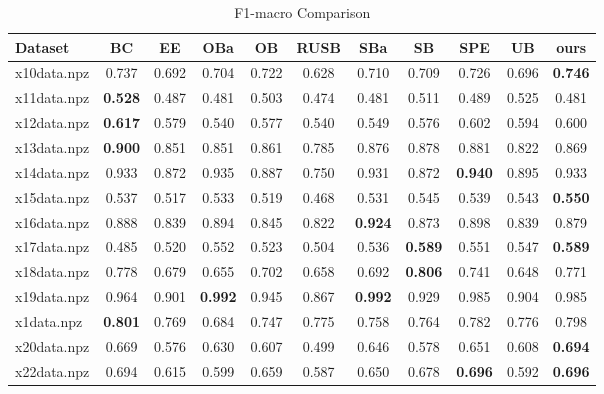 \documentclass{article}
\begin{document}
\begin{table}[htbp]
\centering
\caption{F1-macro Comparison}
\begin{adjustbox}{width=\textwidth}
\label{tab:f1-macro_comparison}
\begin{tabular}{lcccccccccc}
\hline
\textbf{Dataset} & \textbf{BC} & \textbf{EE} & \textbf{OBa} & \textbf{OB} & \textbf{RUSB} & \textbf{SBa} & \textbf{SB} & \textbf{SPE} & \textbf{UB} & \textbf{ours} \\
\hline
x10data.npz & 0.737 & 0.692 & 0.704 & 0.722 & 0.628 & 0.710 & 0.709 & 0.726 & 0.696 & \cellcolor{graybg}\textbf{0.746} \\
x11data.npz & \cellcolor{graybg}\textbf{0.528} & 0.487 & 0.481 & 0.503 & 0.474 & 0.481 & 0.511 & 0.489 & 0.525 & 0.481 \\
x12data.npz & \cellcolor{graybg}\textbf{0.617} & 0.579 & 0.540 & 0.577 & 0.540 & 0.549 & 0.576 & 0.602 & 0.594 & 0.600 \\
x13data.npz & \cellcolor{graybg}\textbf{0.900} & 0.851 & 0.851 & 0.861 & 0.785 & 0.876 & 0.878 & 0.881 & 0.822 & 0.869 \\
x14data.npz & 0.933 & 0.872 & 0.935 & 0.887 & 0.750 & 0.931 & 0.872 & \cellcolor{graybg}\textbf{0.940} & 0.895 & 0.933 \\
x15data.npz & 0.537 & 0.517 & 0.533 & 0.519 & 0.468 & 0.531 & 0.545 & 0.539 & 0.543 & \cellcolor{graybg}\textbf{0.550} \\
x16data.npz & 0.888 & 0.839 & 0.894 & 0.845 & 0.822 & \cellcolor{graybg}\textbf{0.924} & 0.873 & 0.898 & 0.839 & 0.879 \\
x17data.npz & 0.485 & 0.520 & 0.552 & 0.523 & 0.504 & 0.536 & \cellcolor{graybg}\textbf{0.589} & 0.551 & 0.547 & \cellcolor{graybg}\textbf{0.589} \\
x18data.npz & 0.778 & 0.679 & 0.655 & 0.702 & 0.658 & 0.692 & \cellcolor{graybg}\textbf{0.806} & 0.741 & 0.648 & 0.771 \\
x19data.npz & 0.964 & 0.901 & \cellcolor{graybg}\textbf{0.992} & 0.945 & 0.867 & \cellcolor{graybg}\textbf{0.992} & 0.929 & 0.985 & 0.904 & 0.985 \\
x1data.npz & \cellcolor{graybg}\textbf{0.801} & 0.769 & 0.684 & 0.747 & 0.775 & 0.758 & 0.764 & 0.782 & 0.776 & 0.798 \\
x20data.npz & 0.669 & 0.576 & 0.630 & 0.607 & 0.499 & 0.646 & 0.578 & 0.651 & 0.608 & \cellcolor{graybg}\textbf{0.694} \\
x22data.npz & 0.694 & 0.615 & 0.599 & 0.659 & 0.587 & 0.650 & 0.678 & \cellcolor{graybg}\textbf{0.696} & 0.592 & \cellcolor{graybg}\textbf{0.696} \\

\end{tabular}
\end{adjustbox}
\end{table}
\end{document}
